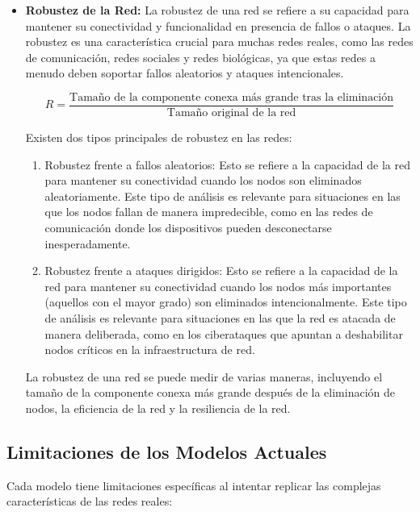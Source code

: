 \begin{itemize}
    \item \textbf{Robustez de la Red:} La robustez de una red se refiere a su capacidad para mantener su conectividad y funcionalidad en presencia de fallos o ataques. La robustez es una característica crucial para muchas redes reales, como las redes de comunicación, redes sociales y redes biológicas, ya que estas redes a menudo deben soportar fallos aleatorios y ataques intencionales.
    
    \[
    R = \frac{\text{Tamaño de la componente conexa más grande tras la eliminación}}{\text{Tamaño original de la red}}
    \]

    Existen dos tipos principales de robustez en las redes:
    
    \begin{enumerate}
        \item Robustez frente a fallos aleatorios: Esto se refiere a la capacidad de la red para mantener su conectividad cuando los nodos son eliminados aleatoriamente. Este tipo de análisis es relevante para situaciones en las que los nodos fallan de manera impredecible, como en las redes de comunicación donde los dispositivos pueden desconectarse inesperadamente.
        \item Robustez frente a ataques dirigidos: Esto se refiere a la capacidad de la red para mantener su conectividad cuando los nodos más importantes (aquellos con el mayor grado) son eliminados intencionalmente. Este tipo de análisis es relevante para situaciones en las que la red es atacada de manera deliberada, como en los ciberataques que apuntan a deshabilitar nodos críticos en la infraestructura de red.
    \end{enumerate}
    La robustez de una red se puede medir de varias maneras, incluyendo el tamaño de la componente conexa más grande después de la eliminación de nodos, la eficiencia de la red y la resiliencia de la red.
    
\end{itemize}

\subsection{Limitaciones de los Modelos Actuales}

Cada modelo tiene limitaciones específicas al intentar replicar las complejas características de las redes reales:

